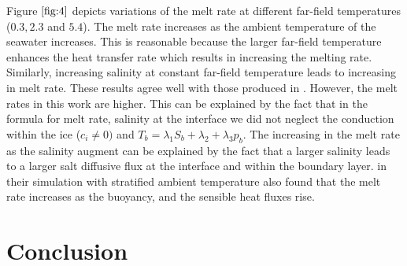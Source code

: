 \documentclass[11pt,a4paper]{article}
\begin{document}
	Figure $\ref{fig:4}$ depicts variations of the melt rate at different far-field temperatures ($0.3, 2.3$ and $5.4$). The melt rate increases as the ambient temperature of the seawater increases. This is reasonable because the larger far-field temperature enhances the heat transfer rate which results in increasing the melting rate. Similarly, increasing salinity at constant far-field temperature leads to increasing in melt rate. These results agree well with those produced in \citep{gayen2016simulation}. However, the melt rates in this work are higher. This can be explained by the fact that in the formula for melt rate, salinity at the interface we did not neglect the conduction within the ice ($c_i \neq 0)$ and $T_b = \lambda_1S_b+\lambda_2+\lambda_3p_b$. The increasing in the melt rate as the salinity augment can be explained by the fact that a larger salinity leads to a larger salt diffusive flux at the interface and within the boundary layer. \cite{jenkins2011convection} in their simulation with stratified ambient temperature also found that the melt rate increases as the buoyancy, and the sensible heat fluxes rise.
	
	
	\section{Conclusion}
	
	
	
	
	
	
	\newpage
	
	
\end{document}
